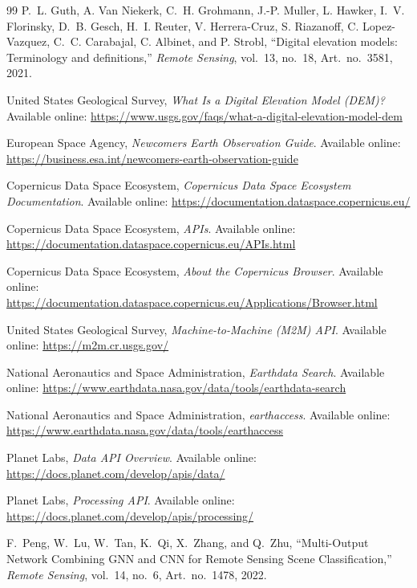 \documentclass[11pt,a4paper]{article}
\begin{document}
\begin{thebibliography}{99}
P.~L. Guth, A. Van Niekerk, C.~H. Grohmann, J.-P. Muller,
L. Hawker, I.~V. Florinsky, D.~B. Gesch, H.~I. Reuter,
V. Herrera-Cruz, S. Riazanoff, C. Lopez-Vazquez,
C.~C. Carabajal, C. Albinet, and P. Strobl,
``Digital elevation models: Terminology and definitions,''
\textit{Remote Sensing},
vol.~13, no.~18, Art.~no.~3581, 2021.

United States Geological Survey,
\textit{What Is a Digital Elevation Model (DEM)?}
Available online:
\url{https://www.usgs.gov/faqs/what-a-digital-elevation-model-dem}

European Space Agency,
\textit{Newcomers Earth Observation Guide}.
Available online:
\url{https://business.esa.int/newcomers-earth-observation-guide}


Copernicus Data Space Ecosystem,
\textit{Copernicus Data Space Ecosystem Documentation}.
Available online:
\url{https://documentation.dataspace.copernicus.eu/}

Copernicus Data Space Ecosystem,
\textit{APIs}.
Available online:
\url{https://documentation.dataspace.copernicus.eu/APIs.html}

Copernicus Data Space Ecosystem,
\textit{About the Copernicus Browser}.
Available online:
\url{https://documentation.dataspace.copernicus.eu/Applications/Browser.html}

United States Geological Survey,
\textit{Machine-to-Machine (M2M) API}.
Available online:
\url{https://m2m.cr.usgs.gov/}

National Aeronautics and Space Administration,
\textit{Earthdata Search}.
Available online:
\url{https://www.earthdata.nasa.gov/data/tools/earthdata-search}

National Aeronautics and Space Administration,
\textit{earthaccess}.
Available online:
\url{https://www.earthdata.nasa.gov/data/tools/earthaccess}

Planet Labs,
\textit{Data API Overview}.
Available online:
\url{https://docs.planet.com/develop/apis/data/}

Planet Labs,
\textit{Processing API}.
Available online:
\url{https://docs.planet.com/develop/apis/processing/}

F.~Peng, W.~Lu, W.~Tan, K.~Qi, X.~Zhang, and Q.~Zhu,
``Multi-Output Network Combining GNN and CNN for Remote Sensing Scene Classification,''
\textit{Remote Sensing},
vol.~14, no.~6, Art.~no.~1478, 2022.


\end{thebibliography}
\end{document}
